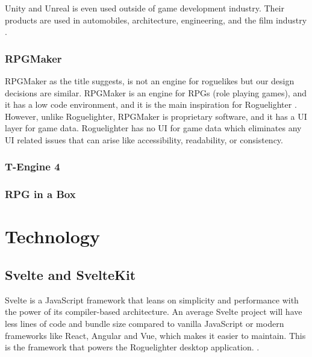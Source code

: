 \documentclass{article}
\begin{document}
Unity and Unreal is even used outside of game development industry. Their products are used in automobiles, architecture, engineering, and the film industry \cite{unity}\cite{unity-industry}\cite{unreal}.


\subsubsection{RPGMaker}
RPGMaker as the title suggests, is not an engine for roguelikes but our design decisions are similar. RPGMaker is an engine for RPGs (role playing games), and it has a low code environment, and it is the main inspiration for Roguelighter \cite{rpgmaker}. \\

However, unlike Roguelighter, RPGMaker is proprietary software, and it has a UI layer for game data. Roguelighter has no UI for game data which eliminates any UI related issues that can arise like accessibility, readability, or consistency.\\ 

\subsubsection{T-Engine 4}

\subsubsection{RPG in a Box}
 
\section{Technology}
\subsection{Svelte and SvelteKit}
Svelte is a JavaScript framework that leans on simplicity and performance with the power of its compiler-based architecture. An average Svelte project will have less lines of code and bundle size compared to vanilla JavaScript or modern frameworks like React, Angular and Vue, which makes it easier to maintain. This is the framework that powers the Roguelighter desktop application. \cite{svelte-less}.\\
\end{document}
